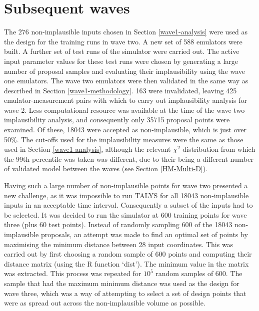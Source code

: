 \documentclass[
  12pt,
  a4paper,
  twoside]{book}
\begin{document}
\hypertarget{subsequent-waves}{%
\section{Subsequent waves}\label{subsequent-waves}}

The 276 non-implausible inputs chosen in Section \ref{wave1-analysis} were used as the design for the training runs in wave two. A new set of 588 emulators were built. A further set of test runs of the simulator were carried out. The active input parameter values for these test runs were chosen by generating a large number of proposal samples and evaluating their implausibility using the wave one emulators. The wave two emulators were then validated in the same way as described in Section \ref{wave1-methodology}. 163 were invalidated, leaving 425 emulator-measurement pairs with which to carry out implausibility analysis for wave 2. Less computational resource was available at the time of the wave two implausibility analysis, and consequently only 35715 proposal points were examined. Of these, 18043 were accepted as non-implausible, which is just over 50\%. The cut-offs used for the implausibility measures were the same as those used in Section \ref{wave1-analysis}, although the relevant \(\chi^2\) distribution from which the 99th percentile was taken was different, due to their being a different number of validated model between the waves (see Section \ref{HM-Multi-D}).

Having such a large number of non-implausible points for wave two presented a new challenge, as it was impossible to run TALYS for all 18043 non-implausible inputs in an acceptable time interval. Consequently a subset of the inputs had to be selected. It was decided to run the simulator at 600 training points for wave three (plus 60 test points). Instead of randomly sampling 600 of the 18043 non-implausible proposals, an attempt was made to find an optimal set of points by maximising the minimum distance between 28 input coordinates. This was carried out by first choosing a random sample of 600 points and computing their distance matrix (using the R function `dist'). The minimum value in the matrix was extracted. This process was repeated for \(10^5\) random samples of 600. The sample that had the maximum minimum distance was used as the design for wave three, which was a way of attempting to select a set of design points that were as spread out across the non-implausible volume as possible.
\end{document}
